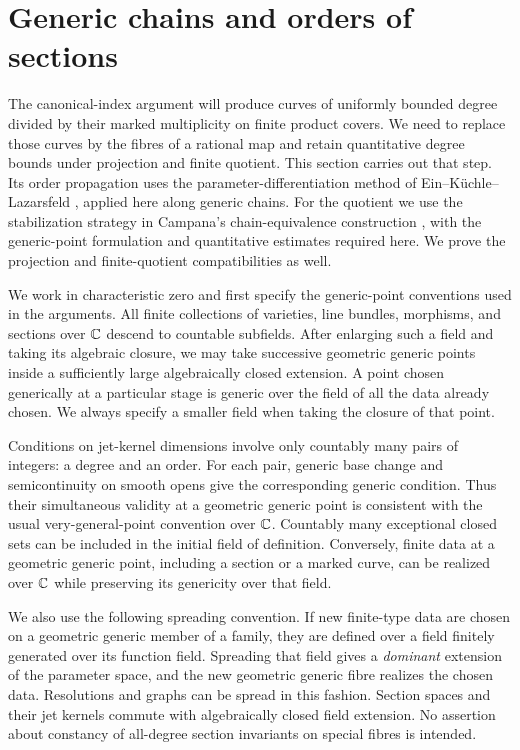 \section{Generic chains and orders of sections}
\label{sec:chains}

The canonical-index argument will produce curves of uniformly bounded
degree divided by their marked multiplicity on finite product covers.
We need to replace those curves by the fibres of a rational map and
retain quantitative degree bounds under projection and finite quotient.
This section carries out that step. Its order propagation uses the
parameter-differentiation method of Ein--K\"uchle--Lazarsfeld
\cite[Proposition~2.3]{EinKuchleLazarsfeld1995}, applied here along
generic chains. For the quotient we use the stabilization strategy in
Campana's chain-equivalence construction
\cite[Theorem~1.1 and its proof sketch]{Campana2004}, with the
generic-point formulation and quantitative estimates required here.
We prove the projection and finite-quotient compatibilities as well.

We work in characteristic zero and first specify the generic-point
conventions used in the arguments.  All finite collections of varieties,
line bundles, morphisms, and sections over $\mathbb C$ descend to countable
subfields.  After enlarging such a field and taking its algebraic closure,
we may take successive geometric generic points inside a sufficiently
large algebraically closed extension.  A point chosen generically at a
particular stage is generic over the field of all the data already chosen.
We always specify a smaller field when taking the closure of that point.

Conditions on jet-kernel dimensions involve only countably many pairs of
integers: a degree and an order.  For each pair, generic base change and
semicontinuity on smooth opens give the corresponding generic condition.
Thus their simultaneous validity at a geometric generic point is
consistent with the usual very-general-point convention over $\mathbb C$.
Countably many exceptional closed sets can be included in the initial
field of definition.  Conversely, finite data at a geometric generic
point, including a section or a marked curve, can be realized over $\mathbb C$
while preserving its genericity over that field.

We also use the following spreading convention.  If new finite-type data
are chosen on a geometric generic member of a family, they are defined
over a field finitely generated over its function field.  Spreading that
field gives a \emph{dominant} extension of the parameter space, and the
new geometric generic fibre realizes the chosen data.  Resolutions and
graphs can be spread in this fashion.  Section spaces and their jet kernels
commute with algebraically closed field extension.  No assertion about
constancy of all-degree section invariants on special fibres is intended.

